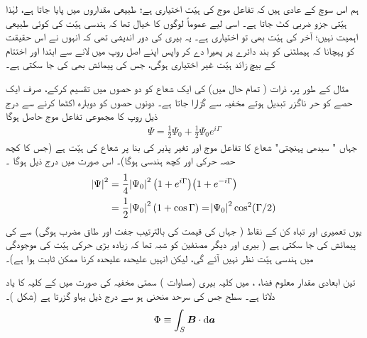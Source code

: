  ہم اس سوچ کے عادی ہیں کہ تفاعل موج کی  ہیّت اختیاری  ہے؛  طبیعی مقداروں میں   پایا جاتا ہے، لہٰذا   ہیّتی جزو ضربی  کٹ جاتا ہے۔  اسی لیے عموماً لوگوں کا خیال تھا کہ ہندسی ہیّت کی کوئی طبیعی اہمیت نہیں؛  آخر  کی  ہیّت بھی تو  اختیاری ہے۔  یہ  بیری کی دور اندیشی تھی  کہ انہوں نے اس حقیقت کو پہچانا کہ ہیملٹنی کو  بند دائرے پر  پھیرا دے کر  واپس اپنے  اصل روپ میں لانے سے ابتدا اور اختتام کے بیچ  زائد     ہیّت  غیر اختیاری ہوگی،    جس کی پیمائش بھی  کی جا سکتی  ہے۔
 
  مثال کے طور پر،  ذرات ( تمام حال  میں)  کی ایک شعاع کو دو حصوں میں تقسیم کرکے،  صرف ایک حصے کو حر ناگزر تبدیل ہوتے مخفیہ سے گزارا جاتا ہے۔ دونوں حصوں کو دوبارہ اکٹھا کرنے سے درج ذیل روپ کا  مجموعی تفاعل موج  حاصل ہوگا 
\begin{align}
\Psi = \frac{1}{2} \Psi_0 + \frac{1}{2} \Psi_0 e^{i \Gamma}
\end{align}
جہاں   " سیدھی پہنچتی"   شعاع کا تفاعل موج   اور     تغیر پذیر   کی بنا پر شعاع کی      ہیّت ہے  (جس کا کچھ حصہ حرکی اور کچھ ہندسی ہوگا)۔   اس صورت میں درج ذیل ہوگا ۔
\begin{align}\label{مساوات_حر_ہیّتی_انتقال}
\abs{\Psi}^2 &= \frac{1}{4} \abs{\Psi_0}^2 \big ( 1 + e^{i \Gamma} \big ) \big ( 1 + e^{- i \Gamma} \big ) \nonumber\\
&= \frac{1}{2} \abs{\Psi_0}^2 (1 + \cos \Gamma) = \abs{\Psi_0}^2 \cos^2 (\Gamma/2)
\end{align}
یوں  تعمیری  اور تباہ کن کے نقاط   ( جہاں  کی قیمت  کی بالترتیب جفت اور طاق مضرب ہوگی)  سے    کی پیمائش کی جا سکتی ہے ( بیری اور دیگر مصنفین کو شبہ تھا کہ زیادہ بڑی حرکی ہیّت کی موجودگی میں ہندسی  ہیّت  نظر نہیں آئے گی،  لیکن انہیں علیحدہ علیحدہ  کرنا ممکن ثابت ہوا ہے)۔ 

 تین ابعادی مقدار معلوم فضا،  ،    میں کلیہ  بیری  (مساوات )  سمتی مخفیہ  کی صورت میں    کے  کلیہ کا  یاد دلاتا ہے۔ سطح  جس کی سرحد منحنی  ہو سے درج ذیل  بہاو گزرتا ہے  (شکل )۔ 
\begin{align}
\Phi \equiv \int_S \kvec{B} \cdot \dif \kvec{a}
\end{align}

